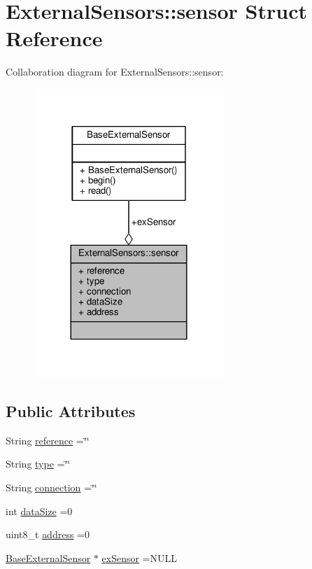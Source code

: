 \hypertarget{structExternalSensors_1_1sensor}{}\section{External\+Sensors\+:\+:sensor Struct Reference}
\label{structExternalSensors_1_1sensor}


Collaboration diagram for External\+Sensors\+:\+:sensor\+:\nopagebreak
\begin{figure}[H]
\begin{center}
\leavevmode
\includegraphics[width=204pt]{structExternalSensors_1_1sensor__coll__graph}
\end{center}
\end{figure}
\subsection*{Public Attributes}
\begin{DoxyCompactItemize}
\item 
String \hyperlink{structExternalSensors_1_1sensor_afed5bdfd49732202a368b600cb8396fe}{reference} =\char`\"{}\char`\"{}
\item 
String \hyperlink{structExternalSensors_1_1sensor_a6acfdb02c742c2110d7bd2b5d9fce9e7}{type} =\char`\"{}\char`\"{}
\item 
String \hyperlink{structExternalSensors_1_1sensor_ae3c8c1da809f2238bc9abde37a6c6022}{connection} =\char`\"{}\char`\"{}
\item 
int \hyperlink{structExternalSensors_1_1sensor_ae9c669bb93befbe4b333920e7f357b80}{data\+Size} =0
\item 
uint8\+\_\+t \hyperlink{structExternalSensors_1_1sensor_a8d70ca58524521ed054fc6b81eb58d34}{address} =0
\item 
\hyperlink{classBaseExternalSensor}{Base\+External\+Sensor} $\ast$ \hyperlink{structExternalSensors_1_1sensor_a9bca150fd468b8d0e090e6d72c5c2b48}{ex\+Sensor} =N\+U\+LL
\end{DoxyCompactItemize}


